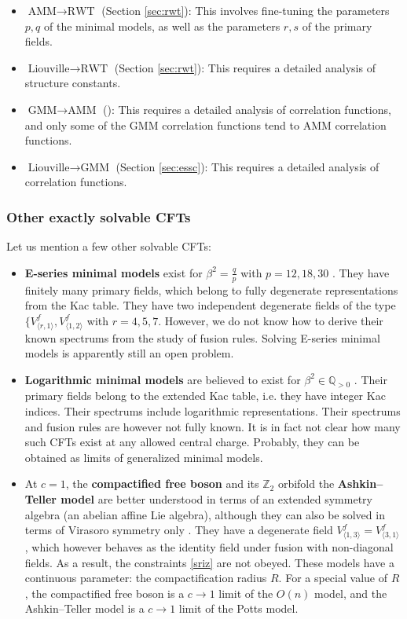 \documentclass[12pt, a4paper]{article}
\theoremstyle{break}
\begin{document}
\begin{itemize}
 \item $\boxed{\text{AMM}\to \text{RWT}}$ (Section \ref{sec:rwt}): This involves fine-tuning the parameters $p,q$ of the minimal models, as well as the parameters $r,s$ of the primary fields.
  \item $\boxed{\text{Liouville}\to \text{RWT}}$ (Section \ref{sec:rwt}): This requires a detailed analysis of structure constants. 
 \item $\boxed{\text{GMM}\to \text{AMM}}$ (\cite{rib18}): This requires a detailed analysis of correlation functions, and only some of the GMM correlation functions tend to AMM correlation functions. 
 \item $\boxed{\text{Liouville}\to \text{GMM}}$ (Section \ref{sec:essc}): This requires a detailed analysis of correlation functions.
\end{itemize}

\subsubsection{Other exactly solvable CFTs}

Let us mention a few other solvable CFTs:
\begin{itemize}
 \item \textbf{E-series minimal models} exist for $\beta^2=\frac{q}{p}$ with $p=12, 18, 30$ \cite{fms97}. They have finitely many primary fields, which belong to fully degenerate representations from the Kac table. 
They have two independent degenerate fields of the type $\{V^f_{\langle r,1\rangle},V^f_{\langle 1,2\rangle}$ with $r=4,5,7$. 
However, we do not know how to derive their known spectrums from the study of fusion rules. 
Solving E-series minimal models is apparently still an open problem. 
\item \textbf{Logarithmic minimal models} are believed to exist for $\beta^2\in \mathbb{Q}_{>0}$ \cite{prz06}. Their primary fields belong to the extended Kac table, i.e. they have integer Kac indices. Their spectrums include logarithmic representations. Their spectrums and fusion rules are however not fully known. It is in fact not clear how many such CFTs exist at any allowed central charge. Probably, they can be obtained as limits of generalized minimal models. 
\item At $c=1$, the \textbf{compactified free boson} and its $\mathbb{Z}_2$ orbifold the \textbf{Ashkin--Teller model} are better understood in terms of an extended symmetry algebra (an abelian affine Lie algebra), although they can also be solved in terms of Virasoro symmetry only \cite{nr21}. They have a degenerate field $V^f_{\langle 1, 3\rangle}=V^f_{\langle 3,1\rangle}$, which however behaves as the identity field under fusion with non-diagonal fields. As a result, the constraints \eqref{sriz} are not obeyed. These models have a continuous parameter: the compactification radius $R$. For a special value of $R$, the compactified free boson is a $c\to 1$ limit of the $O(n)$ model, and the Ashkin--Teller model is a $c\to 1$ limit of the Potts model.
\end{itemize}
\end{document}
